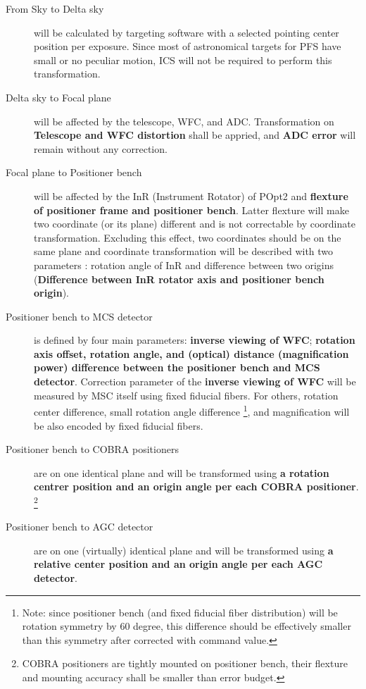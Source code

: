 \documentclass[a4paper,notitlepage]{article}
\begin{document}
\begin{description}
  \item[From Sky to Delta sky] 
    will be calculated by targeting software with a selected pointing center 
    position per exposure. 
    Since most of astronomical targets for PFS have small or no peculiar 
    motion, ICS will not be required to perform this transformation.
  \item[Delta sky to Focal plane]
    will be affected by the telescope, WFC, and ADC. 
    Transformation on {\bf Telescope and WFC distortion} shall be appried, 
    and {\bf ADC error} will remain without any correction. 
  \item[Focal plane to Positioner bench] 
    will be affected by the InR (Instrument Rotator) of POpt2 and {\bf flexture 
    of positioner frame and positioner bench}. Latter flexture will make two 
    coordinate (or its plane) different and is not correctable by coordinate 
    transformation. Excluding this effect, two coordinates should be on the 
    same plane and coordinate transformation will be described with two 
    parameters : rotation angle of InR and difference between two origins
    ({\bf Difference between InR rotator axis and positioner bench origin}). 
  \item[Positioner bench to MCS detector]
    is defined by four main parameters: 
    {\bf inverse viewing of WFC}; {\bf rotation axis offset, rotation angle, 
    and (optical) distance (magnification power) difference between 
    the positioner bench and MCS detector}. 
    Correction parameter of the {\bf inverse viewing of WFC} will be 
    measured by MSC itself using fixed fiducial fibers. 
    For others, rotation center difference, small rotation angle difference 
    \footnote{Note: since positioner bench (and fixed fiducial fiber 
    distribution) will be rotation symmetry by 60 degree, this difference 
    should be effectively smaller than this symmetry after corrected with 
    command value.}, and magnification will be also encoded by fixed fiducial 
    fibers. 
  \item[Positioner bench to COBRA positioners] 
    are on one identical plane and 
    will be transformed using {\bf a rotation centrer position and an origin 
    angle per each COBRA positioner}. 
    \footnote{COBRA positioners are tightly mounted on positioner bench, 
    their flexture and mounting accuracy shall be smaller than error budget.}
  \item[Positioner bench to AGC detector]
    are on one (virtually) identical plane and 
    will be transformed using {\bf a relative center position and an origin 
    angle per each AGC detector}. 
\end{description}
\end{document}
